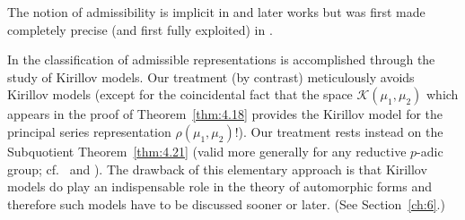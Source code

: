 The notion of admissibility is implicit in \cite{Mautner} and later works but was first made completely precise (and first fully exploited) in \cite{JacquetLanglands}.

In \cite{JacquetLanglands} the classification of admissible representations is accomplished through the study of Kirillov models. Our treatment (by contrast) meticulously avoids Kirillov models (except for the coincidental fact that the space $\mathcal{K}(\mu_1, \mu_2)$ which appears in the proof of Theorem~\ref{thm:4.18} provides the Kirillov model for the principal series representation $\rho(\mu_1, \mu_2)$!). Our treatment rests instead on the Subquotient Theorem~\ref{thm:4.21} (valid more generally for any reductive $p$-adic group; cf.\ \cite{HarishChandra3} and \cite{Jacquet}). The drawback of this elementary approach is that Kirillov models do play an indispensable role in the theory of automorphic forms and therefore such models have to be discussed sooner or later. (See Section~\ref{ch:6}.)
